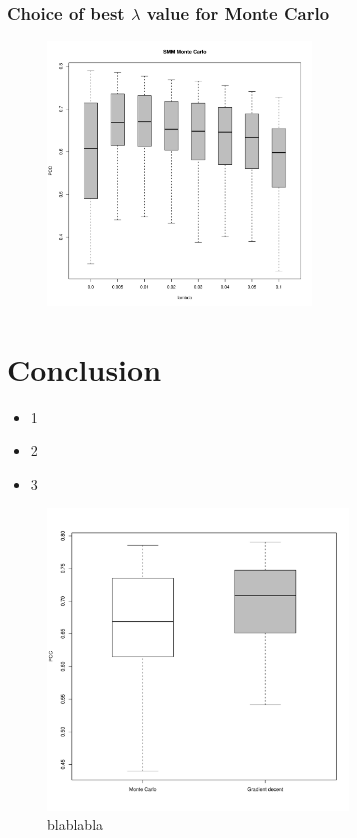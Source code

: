 \documentclass[presentation]{beamer}   %
\begin{document}
\begin{frame}[plain]
  \frametitle{Choice of best $\lambda$ value for Monte Carlo}
	\begin{figure}
		\centering
		\includegraphics[width=70mm,height=70mm]{fig/choice_lambda_mc.pdf}
	\end{figure}
\end{frame}

\section{Conclusion}
\begin{frame}
\begin{itemize}
\item 1 \pause
\item 2 \pause
\item 3
\end{itemize}
\end{frame}
\begin{frame}[plain]
	\begin{figure}
	\centering
	\includegraphics[width=80mm,height=80mm]{fig/boxplot.pdf}
	\caption{blablabla}
	\end{figure}
\end{frame}
\end{document}
